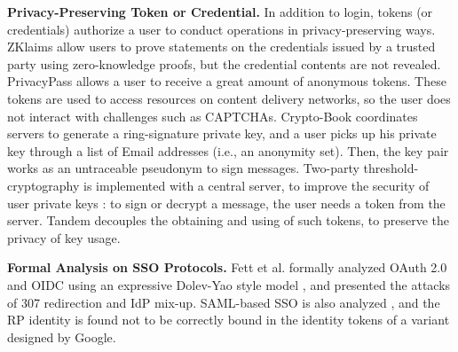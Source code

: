 \vspace{0.5mm}
\noindent\textbf{Privacy-Preserving Token or Credential.}
In addition to login,
    tokens (or credentials) authorize a user to conduct operations
        in privacy-preserving ways.
ZKlaims \cite{zklaim} allow users to prove statements on the credentials issued by a trusted party
    using zero-knowledge proofs,
        but the credential contents are not revealed.
PrivacyPass \cite{privacypass} allows a user to receive a great amount of anonymous tokens.
 These tokens are used to access resources on content delivery networks,
    so  the user does not interact with challenges such as CAPTCHAs.
Crypto-Book \cite{crypto-book} coordinates servers to generate a ring-signature private key,
 and a user picks up his private key through a list of Email addresses (i.e., an anonymity set).
 Then, the key pair works as an untraceable pseudonym to sign messages.
Two-party threshold-cryptography is implemented with a central server,
    to improve the security of user private keys \cite{mRSA,ss-rsa}:
    to sign or decrypt a message, the user needs a token from the server.
    Tandem \cite{tandem} decouples the obtaining and using of such tokens,
to preserve the privacy of key usage.

\vspace{0.5mm}
\noindent\textbf{Formal Analysis on SSO Protocols.}
Fett et al. \cite{FettKS16, FettKS17} formally analyzed OAuth 2.0 and OIDC using an expressive Dolev-Yao style model \cite{FettKS14},
    and presented the attacks of 307 redirection and IdP mix-up.
SAML-based SSO is also analyzed \cite{ArmandoCCCT08},
    and the RP identity is found not to be correctly bound in the identity tokens of a variant designed by Google.



